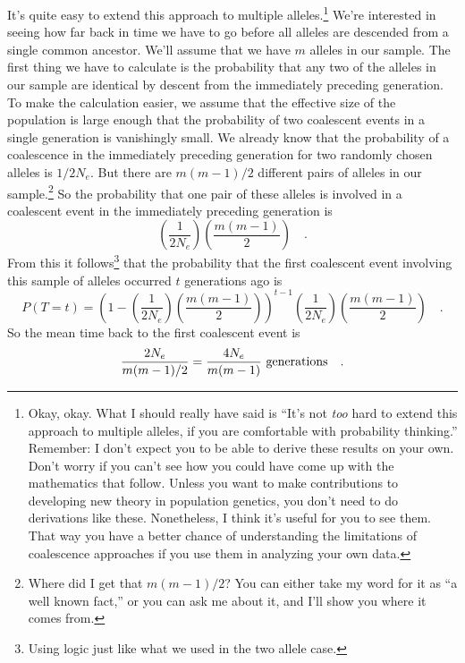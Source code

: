 It's quite easy to extend this approach to multiple
alleles.\footnote{Okay, okay. What I should really have said is ``It's
  not {\it too\/} hard to extend this approach to multiple alleles, if
  you are comfortable with probability thinking.'' Remember: I don't
  expect you to be able to derive these results on your own. Don't
  worry if you can't see how you could have come up with the
  mathematics that follow. Unless you want to make contributions to
  developing new theory in population genetics, you don't need to do
  derivations like these. Nonetheless, I think it's useful for you to
  see them. That way you have a better chance of understanding the
  limitations of coalescence approaches if you use them in analyzing
  your own data.}  We're interested in seeing how far back in time we
have to go before all alleles are descended from a single common
ancestor. We'll assume that we have $m$ alleles in our sample. The
first thing we have to calculate is the probability that any two of
the alleles in our sample are identical by descent from the
immediately preceding generation. To make the calculation easier, we
assume that the effective size of the population is large enough that
the probability of two coalescent events in a single generation is
vanishingly small. We already know that the probability of a
coalescence in the immediately preceding generation for two randomly
chosen alleles is $1/2N_e$. But there are $m(m-1)/2$ different pairs
of alleles in our sample.\footnote{Where did I get that $m(m-1)/2$?
  You can either take my word for it as ``a well known fact,'' or you
  can ask me about it, and I'll show you where it comes from.} So the
probability that one pair of these alleles is involved in a coalescent
event in the immediately preceding generation is
\begin{equation}
  \left(\frac{1}{2N_e}\right)\left(\frac{m(m-1)}{2}\right) \quad .
  \label{eq:multi-allele-first-event}
\end{equation}
From this it follows\footnote{Using logic just like what we used in
the two allele case.} that the probability that the first coalescent
event involving this sample of alleles occurred $t$ generations ago is
\begin{equation}
P(T=t) =
\left(1-\left(\frac{1}{2N_e}\right)\left(\frac{m(m-1)}{2}\right)\right)^{t-1}
\left(\frac{1}{2N_e}\right)\left(\frac{m(m-1)}{2}\right)
\quad .
\label{eq:multi-allele}
\end{equation}
So the mean time back to the first coalescent event is
\[
\frac{2N_e}{m(m-1)/2} = \frac{4N_e}{m(m-1)} \hbox{ generations} \quad .
\]

